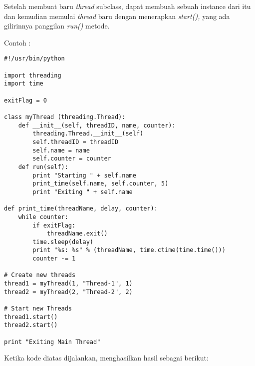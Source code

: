 \documentclass [12pt,a4paper,notitlepage,oneside,bahasa]{article}
\begin{document}
\vspace{12pt}

Setelah membuat baru \textit{thread} subclass, dapat membuah sebuah instance dari itu dan kemudian memulai \textit{thread} baru dengan menerapkan \textit{start(),} yang ada gilirinnya panggilan \textit{run()} metode. \par
\vspace{12pt}
	Contoh :
\begin{verbatim}
#!/usr/bin/python

import threading
import time

exitFlag = 0

class myThread (threading.Thread):
    def __init__(self, threadID, name, counter):
        threading.Thread.__init__(self)
        self.threadID = threadID
        self.name = name
        self.counter = counter
    def run(self):
        print "Starting " + self.name
        print_time(self.name, self.counter, 5)
        print "Exiting " + self.name

def print_time(threadName, delay, counter):
    while counter:
        if exitFlag:
            threadName.exit()
        time.sleep(delay)
        print "%s: %s" % (threadName, time.ctime(time.time()))
        counter -= 1

# Create new threads
thread1 = myThread(1, "Thread-1", 1)
thread2 = myThread(2, "Thread-2", 2)

# Start new Threads
thread1.start()
thread2.start()

print "Exiting Main Thread"
\end{verbatim}
	Ketika kode diatas dijalankan, menghasilkan hasil sebagai berikut:
\end{document}
